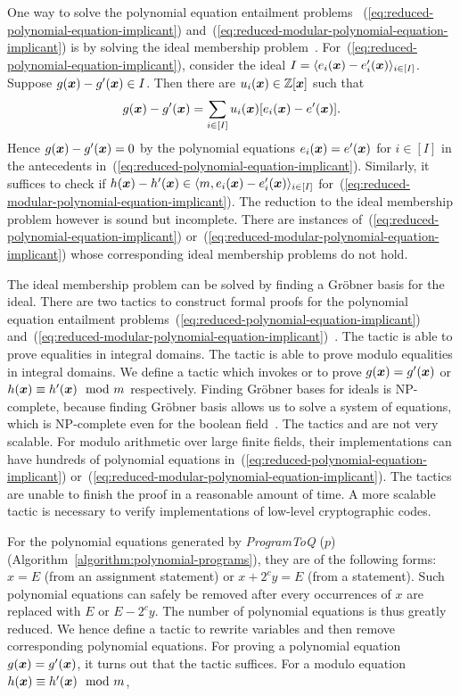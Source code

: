 One way to solve the polynomial equation entailment problems
~(\ref{eq:reduced-polynomial-equation-implicant})
and~(\ref{eq:reduced-modular-polynomial-equation-implicant}) is by
solving the ideal membership problem~\cite{H:07:AENTP,BS:16:GFEV}. 
For~(\ref{eq:reduced-polynomial-equation-implicant}), consider the
ideal $I = \langle e_i(\vx) - e'_i(\vx) \rangle_{i \in [I]}$. Suppose
$g(\vx) - g'(\vx) \in I$. Then there are $u_i(\vx) \in \bbfZ[\vx]$
such that 
\[
g(\vx) - g'(\vx) = \sum\limits_{i \in [I]} u_i (\vx) [e_i (\vx) - e' (\vx)].
\]
Hence $g(\vx) - g'(\vx) = 0$ by the polynomial equations $e_i (\vx) =
e' (\vx)$ for $i \in [I]$ in the antecedents
in~(\ref{eq:reduced-polynomial-equation-implicant}). Similarly, it
suffices to check if $h(\vx) - h'(\vx) \in \langle m, e_i(\vx) -
e'_i(\vx) \rangle_{i \in [I]}$
for~(\ref{eq:reduced-modular-polynomial-equation-implicant}).
The reduction to the ideal membership problem however is sound but
incomplete. There are instances
of~(\ref{eq:reduced-polynomial-equation-implicant})
or~(\ref{eq:reduced-modular-polynomial-equation-implicant}) whose
corresponding ideal membership problems do not hold. 

The ideal membership problem can be solved by finding a Gr\"obner
basis for the ideal. There are two \coq tactics to
construct formal proofs for the polynomial equation entailment
problems~(\ref{eq:reduced-polynomial-equation-implicant})
and~(\ref{eq:reduced-modular-polynomial-equation-implicant})~\cite{P:08:CGBP,P:10:CGBP}. 
The tactic  is able to prove
equalities in integral domains. The tactic  is able
to prove modulo equalities in integral domains. We define a
\coq tactic which invokes  or  
to prove $g (\vx) = g' (\vx)$ or $h (\vx) \equiv
h' (\vx) \mod m$ respectively. Finding Gr\"obner bases for ideals is
%
NP-complete, because finding Gr\"obner basis allows us to
  solve a system of equations, which is NP-complete even for the
  boolean field~\cite{GJ:1979:CAI}.
%
The tactics  and  are not very
scalable.
For modulo arithmetic over large finite fields, their 
implementations can have hundreds of polynomial equations
in~(\ref{eq:reduced-polynomial-equation-implicant})
or~(\ref{eq:reduced-modular-polynomial-equation-implicant}). 
The \coq tactics are unable to finish
the proof in a reasonable amount of time. A more scalable tactic is
necessary to verify implementations of low-level cryptographic codes.

For the polynomial equations generated by \textit{ProgramToQ}
($p$) (Algorithm~\ref{algorithm:polynomial-programs}), they are of the
following forms: $x = E$ (from an assignment statement) or $x + 2^c y
= E$ (from a  statement). Such polynomial equations can
safely be removed after every occurrences of $x$ are replaced with $E$
or $E - 2^c y$. The number of polynomial equations is thus greatly
reduced. We hence define a \coq tactic to rewrite variables and then
remove corresponding polynomial equations. For proving a polynomial
equation $g (\vx) = g' (\vx)$, it turns out that the \coq tactic
 suffices. For a modulo equation $h (\vx) \equiv
h' (\vx) \mod m$, 

